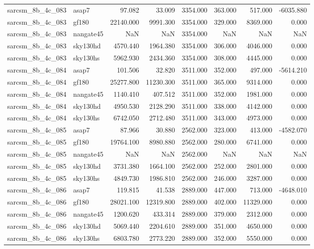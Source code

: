 \begin{tabular}{llrrrrrr}
sarcsm\_8b\_4c\_083 & asap7 & 97.082 & 33.009 & 3354.000 & 363.000 & 517.000 & -6035.880 \\
sarcsm\_8b\_4c\_083 & gf180 & 22140.000 & 9991.300 & 3354.000 & 329.000 & 8369.000 & 0.000 \\
sarcsm\_8b\_4c\_083 & nangate45 & NaN & NaN & 3354.000 & NaN & NaN & NaN \\
sarcsm\_8b\_4c\_083 & sky130hd & 4570.440 & 1964.380 & 3354.000 & 306.000 & 4046.000 & 0.000 \\
sarcsm\_8b\_4c\_083 & sky130hs & 5962.930 & 2434.360 & 3354.000 & 308.000 & 4445.000 & 0.000 \\
sarcsm\_8b\_4c\_084 & asap7 & 101.506 & 32.820 & 3511.000 & 352.000 & 497.000 & -5614.210 \\
sarcsm\_8b\_4c\_084 & gf180 & 25277.800 & 11230.300 & 3511.000 & 365.000 & 9314.000 & 0.000 \\
sarcsm\_8b\_4c\_084 & nangate45 & 1140.410 & 407.512 & 3511.000 & 352.000 & 1981.000 & 0.000 \\
sarcsm\_8b\_4c\_084 & sky130hd & 4950.530 & 2128.290 & 3511.000 & 338.000 & 4142.000 & 0.000 \\
sarcsm\_8b\_4c\_084 & sky130hs & 6742.050 & 2712.480 & 3511.000 & 343.000 & 4973.000 & 0.000 \\
sarcsm\_8b\_4c\_085 & asap7 & 87.966 & 30.880 & 2562.000 & 323.000 & 413.000 & -4582.070 \\
sarcsm\_8b\_4c\_085 & gf180 & 19764.100 & 8980.880 & 2562.000 & 280.000 & 6741.000 & 0.000 \\
sarcsm\_8b\_4c\_085 & nangate45 & NaN & NaN & 2562.000 & NaN & NaN & NaN \\
sarcsm\_8b\_4c\_085 & sky130hd & 3731.380 & 1664.100 & 2562.000 & 252.000 & 2801.000 & 0.000 \\
sarcsm\_8b\_4c\_085 & sky130hs & 4849.730 & 1986.810 & 2562.000 & 246.000 & 3287.000 & 0.000 \\
sarcsm\_8b\_4c\_086 & asap7 & 119.815 & 41.538 & 2889.000 & 447.000 & 713.000 & -4648.010 \\
sarcsm\_8b\_4c\_086 & gf180 & 28021.100 & 12319.800 & 2889.000 & 402.000 & 11329.000 & 0.000 \\
sarcsm\_8b\_4c\_086 & nangate45 & 1200.620 & 433.314 & 2889.000 & 379.000 & 2312.000 & 0.000 \\
sarcsm\_8b\_4c\_086 & sky130hd & 5069.440 & 2204.610 & 2889.000 & 351.000 & 4650.000 & 0.000 \\
sarcsm\_8b\_4c\_086 & sky130hs & 6803.780 & 2773.220 & 2889.000 & 352.000 & 5550.000 & 0.000 \\

\end{tabular}
